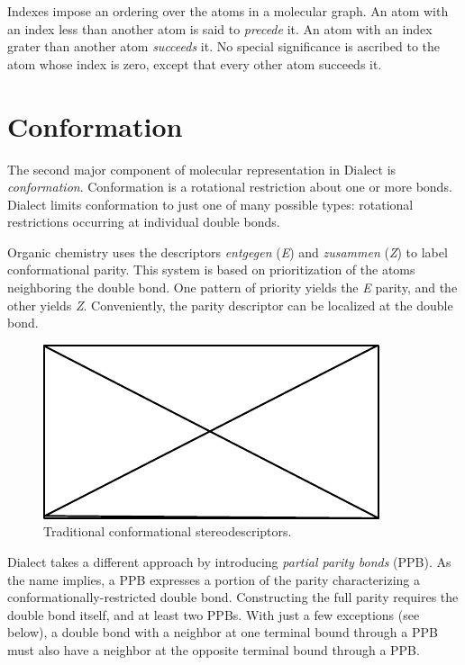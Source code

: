 \documentclass{article}
\begin{document}
Indexes impose an ordering over the atoms in a molecular graph. An atom with an index less than another atom is said to \textit{precede} it. An atom with an index grater than another atom \textit{succeeds} it. No special significance is ascribed to the atom whose index is zero, except that every other atom succeeds it.

\section*{Conformation}

The second major component of molecular representation in Dialect is \textit{conformation}. Conformation is a rotational restriction about one or more bonds. Dialect limits conformation to just one of many possible types: rotational restrictions occurring at individual double bonds.

Organic chemistry uses the descriptors \textit{entgegen} (\textit{E}) and \textit{zusammen} (\textit{Z}) to label conformational parity. This system is based on prioritization of the atoms neighboring the double bond. One pattern of priority yields the \textit{E} parity, and the other yields \textit{Z}. Conveniently, the parity descriptor can be localized at the double bond.

\begin{figure}
    \centering
    \includegraphics{filler}
    \caption{Traditional conformational stereodescriptors.}
    \label{fig:traditional-conformational-stereodescriptors}
\end{figure}

Dialect takes a different approach by introducing \textit{partial parity bonds} (PPB). As the name implies, a PPB expresses a portion of the parity characterizing a conformationally-restricted double bond. Constructing the full parity requires the double bond itself, and at least two PPBs. With just a few exceptions (see below), a double bond with a neighbor at one terminal bound through a PPB must also have a neighbor at the opposite terminal bound through a PPB.
\end{document}
